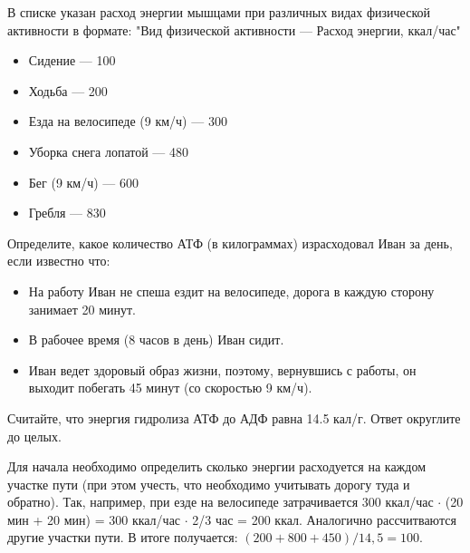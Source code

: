 
В списке указан расход энергии мышцами при различных
видах физической активности в формате: "Вид физической активности — Расход энергии, ккал/час"

\begin{itemize}
    \item Сидение — 100
    \item Ходьба — 200
    \item Езда на велосипеде (9 км/ч) — 300
    \item Уборка снега лопатой — 480
    \item Бег (9 км/ч) — 600
    \item Гребля — 830
\end{itemize}
 
Определите, какое количество АТФ
(в килограммах) израсходовал Иван за день, если известно что:

\begin{itemize}
    \item На работу Иван не спеша ездит на велосипеде, дорога в каждую сторону занимает 20 минут.
    \item В рабочее время (8 часов в день) Иван сидит.
    \item Иван ведет здоровый образ жизни, поэтому, вернувшись с работы, он выходит побегать 45 минут (со скоростью 9 км/ч).
\end{itemize}

Считайте, что энергия гидролиза
АТФ до АДФ равна 14.5 кал/г. Ответ округлите до целых.

\explanationSection

Для начала необходимо определить сколько энергии расходуется на каждом участке пути (при этом учесть, что необходимо учитывать дорогу туда и обратно). Так, например, при езде на велосипеде затрачивается 300 ккал/час $\cdot$ (20 мин + 20 мин) = 300 ккал/час $\cdot$ 2/3 час = 200 ккал. Аналогично рассчитваются другие участки пути. В итоге получается:
 $(200 + 800 + 450) / 14,5 = 100.$

